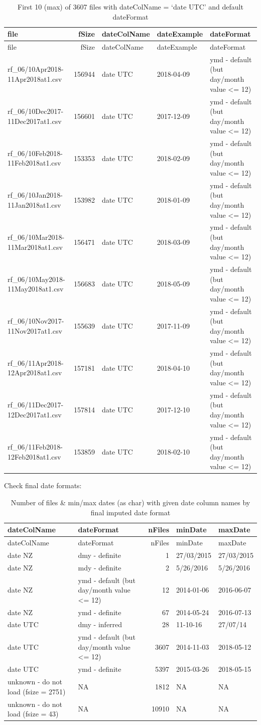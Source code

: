 \documentclass[]{article}
\begin{document}
\begin{longtable}[]{@{}lrlll@{}}
\caption{First 10 (max) of 3607 files with dateColName = `date UTC' and
default dateFormat}\tabularnewline
\toprule
file & fSize & dateColName & dateExample & dateFormat\tabularnewline
\midrule
\endfirsthead
\toprule
file & fSize & dateColName & dateExample & dateFormat\tabularnewline
\midrule
\endhead
rf\_06/10Apr2018-11Apr2018at1.csv & 156944 & date UTC & 2018-04-09 & ymd
- default (but day/month value \textless{}= 12)\tabularnewline
rf\_06/10Dec2017-11Dec2017at1.csv & 156601 & date UTC & 2017-12-09 & ymd
- default (but day/month value \textless{}= 12)\tabularnewline
rf\_06/10Feb2018-11Feb2018at1.csv & 153353 & date UTC & 2018-02-09 & ymd
- default (but day/month value \textless{}= 12)\tabularnewline
rf\_06/10Jan2018-11Jan2018at1.csv & 153982 & date UTC & 2018-01-09 & ymd
- default (but day/month value \textless{}= 12)\tabularnewline
rf\_06/10Mar2018-11Mar2018at1.csv & 156471 & date UTC & 2018-03-09 & ymd
- default (but day/month value \textless{}= 12)\tabularnewline
rf\_06/10May2018-11May2018at1.csv & 156683 & date UTC & 2018-05-09 & ymd
- default (but day/month value \textless{}= 12)\tabularnewline
rf\_06/10Nov2017-11Nov2017at1.csv & 155639 & date UTC & 2017-11-09 & ymd
- default (but day/month value \textless{}= 12)\tabularnewline
rf\_06/11Apr2018-12Apr2018at1.csv & 157181 & date UTC & 2018-04-10 & ymd
- default (but day/month value \textless{}= 12)\tabularnewline
rf\_06/11Dec2017-12Dec2017at1.csv & 157814 & date UTC & 2017-12-10 & ymd
- default (but day/month value \textless{}= 12)\tabularnewline
rf\_06/11Feb2018-12Feb2018at1.csv & 153859 & date UTC & 2018-02-10 & ymd
- default (but day/month value \textless{}= 12)\tabularnewline
\bottomrule
\end{longtable}

Check final date formats:

\begin{longtable}[]{@{}llrll@{}}
\caption{Number of files \& min/max dates (as char) with given date
column names by final imputed date format}\tabularnewline
\toprule
dateColName & dateFormat & nFiles & minDate & maxDate\tabularnewline
\midrule
\endfirsthead
\toprule
dateColName & dateFormat & nFiles & minDate & maxDate\tabularnewline
\midrule
\endhead
date NZ & dmy - definite & 1 & 27/03/2015 & 27/03/2015\tabularnewline
date NZ & mdy - definite & 2 & 5/26/2016 & 5/26/2016\tabularnewline
date NZ & ymd - default (but day/month value \textless{}= 12) & 12 &
2014-01-06 & 2016-06-07\tabularnewline
date NZ & ymd - definite & 67 & 2014-05-24 & 2016-07-13\tabularnewline
date UTC & dmy - inferred & 28 & 11-10-16 & 27/07/14\tabularnewline
date UTC & ymd - default (but day/month value \textless{}= 12) & 3607 &
2014-11-03 & 2018-05-12\tabularnewline
date UTC & ymd - definite & 5397 & 2015-03-26 &
2018-05-15\tabularnewline
unknown - do not load (fsize = 2751) & NA & 1812 & NA &
NA\tabularnewline
unknown - do not load (fsize = 43) & NA & 10910 & NA & NA\tabularnewline
\bottomrule
\end{longtable}
\end{document}
